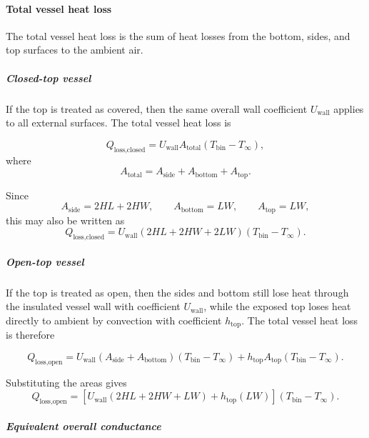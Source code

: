\documentclass{article}
\begin{document}
\paragraph{Total vessel heat loss}

The total vessel heat loss is the sum of heat losses from the bottom, sides,
and top surfaces to the ambient air.

\subparagraph{Closed-top vessel}

If the top is treated as covered, then the same overall wall coefficient
$U_{\text{wall}}$ applies to all external surfaces. The total vessel heat
loss is

\begin{equation}
Q_{\text{loss,closed}}
=
U_{\text{wall}}A_{\text{total}}(T_{\text{bin}}-T_{\infty}),
\end{equation}
where
\begin{equation}
A_{\text{total}} = A_{\text{side}} + A_{\text{bottom}} + A_{\text{top}}.
\end{equation}

Since
\begin{equation}
A_{\text{side}} = 2HL + 2HW,
\qquad
A_{\text{bottom}} = LW,
\qquad
A_{\text{top}} = LW,
\end{equation}
this may also be written as
\begin{equation}
Q_{\text{loss,closed}}
=
U_{\text{wall}}
\left(
2HL + 2HW + 2LW
\right)
(T_{\text{bin}}-T_{\infty}).
\end{equation}

\subparagraph{Open-top vessel}

If the top is treated as open, then the sides and bottom still lose heat
through the insulated vessel wall with coefficient $U_{\text{wall}}$, while
the exposed top loses heat directly to ambient by convection with coefficient
$h_{\text{top}}$. The total vessel heat loss is therefore

\begin{equation}
Q_{\text{loss,open}}
=
U_{\text{wall}}(A_{\text{side}}+A_{\text{bottom}})(T_{\text{bin}}-T_{\infty})
+
h_{\text{top}}A_{\text{top}}(T_{\text{bin}}-T_{\infty}).
\end{equation}

Substituting the areas gives
\begin{equation}
Q_{\text{loss,open}}
=
\left[
U_{\text{wall}}(2HL+2HW+LW)
+
h_{\text{top}}(LW)
\right]
(T_{\text{bin}}-T_{\infty}).
\end{equation}

\subparagraph{Equivalent overall conductance}
\end{document}
